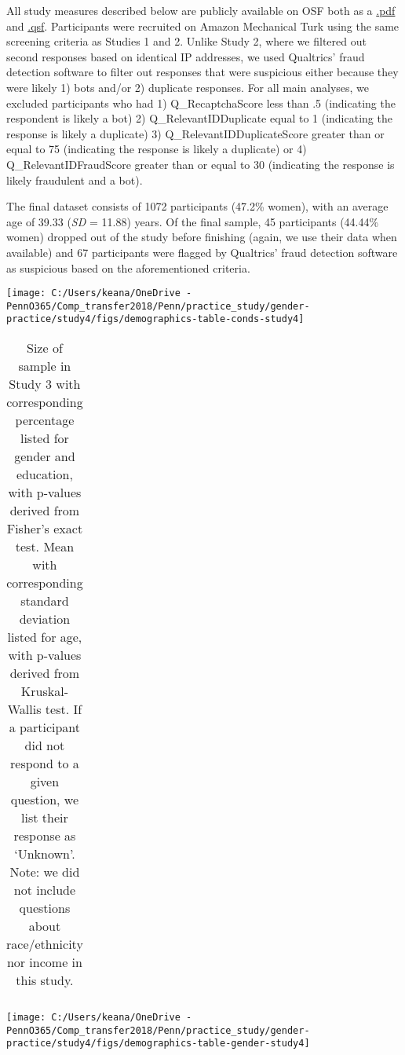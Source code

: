 \documentclass[letterpaper, nobind]{templates/ociamthesis}
\begin{document}
All study measures described below are publicly available on OSF both as a \href{https://osf.io/yfd2j/}{.pdf} and \href{https://osf.io/vhzy5/}{.qsf}. Participants were recruited on Amazon Mechanical Turk using the same screening criteria as Studies 1 and 2. Unlike Study 2, where we filtered out second responses based on identical IP addresses, we used Qualtrics' fraud detection software to filter out responses that were suspicious either because they were likely 1) bots and/or 2) duplicate responses. For all main analyses, we excluded participants who had 1) Q\_RecaptchaScore less than .5 (indicating the respondent is likely a bot) 2) Q\_RelevantIDDuplicate equal to 1 (indicating the response is likely a duplicate) 3) Q\_RelevantIDDuplicateScore greater than or equal to 75 (indicating the response is likely a duplicate) or 4) Q\_RelevantIDFraudScore greater than or equal to 30 (indicating the response is likely fraudulent and a bot).

The final dataset consists of 1072 participants (47.2\% women), with an average age of 39.33 (\emph{SD} = 11.88) years. Of the final sample, 45 participants (44.44\% women) dropped out of the study before finishing (again, we use their data when available) and 67 participants were flagged by Qualtrics' fraud detection software as suspicious based on the aforementioned criteria.

\begin{center}\texttt{[image: C:/Users/keana/OneDrive - PennO365/Comp\_transfer2018/Penn/practice\_study/gender-practice/study4/figs/demographics-table-conds-study4]} \end{center}

\begin{table}[ht]
\centering
\begingroup\fontsize{0.1pt}{0.1pt}\selectfont
\begin{tabular}{r}
   \\ 
 \end{tabular}
\endgroup
\caption{Size of sample in Study 3 with corresponding percentage listed for gender and education, with p-values derived from Fisher’s exact test. Mean with corresponding standard deviation listed for age, with p-values derived from Kruskal-Wallis test. If a participant did not respond to a given question, we list their response as ‘Unknown’. Note: we did not include questions about race/ethnicity nor income in this study.} 
\label{tab:demographics-table-study4}
\end{table}

\begin{center}\texttt{[image: C:/Users/keana/OneDrive - PennO365/Comp\_transfer2018/Penn/practice\_study/gender-practice/study4/figs/demographics-table-gender-study4]} \end{center}
\end{document}
